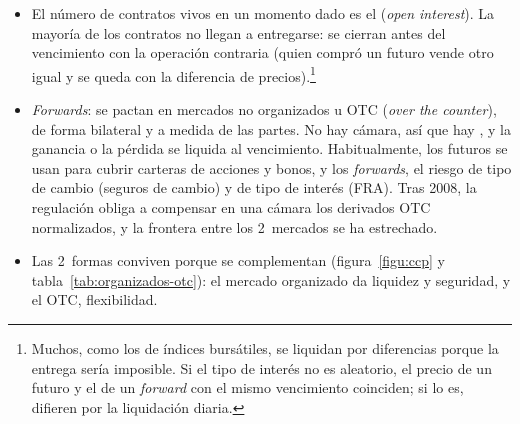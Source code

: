 \documentclass[11pt]{article}
\begin{document}
\begin{itemize}
\begin{itemize}
  \end{itemize}
  \begin{itemize}
  \item Por ejemplo, en un futuro sobre un índice que valga 10~euros por punto, como el del IBEX~35~en MEFF, quien compra un contrato a 15.000~puntos tiene una exposición de 150.000~euros. Si el índice cierra en 14.800, ese día se le cargan 2.000~euros; si al día siguiente cierra en 15.300, se le abonan 5.000. Con unas garantías que son una pequeña fracción del nominal, el apalancamiento es grande.
  \end{itemize}
\item El número de contratos vivos en un momento dado es el  (\emph{open interest}). La mayoría de los contratos no llegan a entregarse: se cierran antes del vencimiento con la operación contraria (quien compró un futuro vende otro igual y se queda con la diferencia de precios).\footnote{Muchos, como los de índices bursátiles, se liquidan por diferencias porque la entrega sería imposible\nocite{Hull2022Options}. Si el tipo de interés no es aleatorio, el precio de un futuro y el de un \emph{forward} con el mismo vencimiento coinciden; si lo es, difieren por la liquidación diaria\nocite{CoxIngersollRoss1981Relation}.}
\item \emph{Forwards}: se pactan en mercados no organizados u OTC (\emph{over the counter}), de forma bilateral y a medida de las partes. No hay cámara, así que hay , y la ganancia o la pérdida se liquida al vencimiento. Habitualmente, los futuros se usan para cubrir carteras de acciones y bonos, y los \emph{forwards}, el riesgo de tipo de cambio (seguros de cambio) y de tipo de interés (FRA). Tras 2008, la regulación obliga a compensar en una cámara los derivados OTC normalizados, y la frontera entre los 2~mercados se ha estrechado.
\item Las 2~formas conviven porque se complementan (figura~\ref{figu:ccp} y tabla~\ref{tab:organizados-otc}): el mercado organizado da liquidez y seguridad, y el OTC, flexibilidad.
\end{itemize}

\begin{infografia}[H]
\centering
\caption{Compensación bilateral y compensación con una cámara de contrapartida central}\label{figu:ccp}
\end{infografia}
\end{document}
